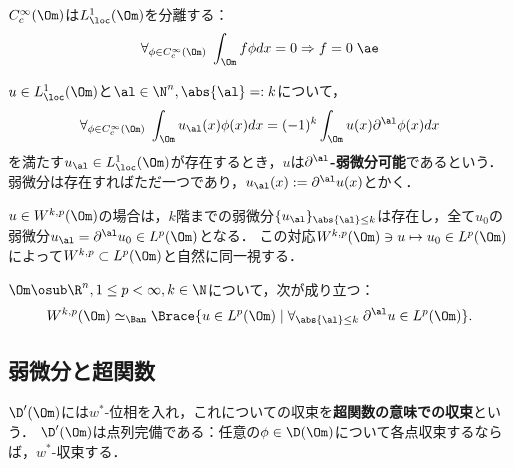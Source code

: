 \documentclass[uplatex, dvipdfmx]{jsreport}
\begin{document}
\begin{lemma}[変分法の基本補題]
    $C_c^\infty(\Om)$は$L^1_\loc(\Om)$を分離する：
    \[\forall_{\phi\in C_c^\infty(\Om)}\;\int_\Om f\phi dx=0\Rightarrow f=0\;\ae\]
\end{lemma}

\begin{definition}[弱微分]
    $u\in L^1_\loc(\Om)$と$\al\in\N^n,\abs{\al}=:k$について，
    \[\forall_{\phi\in C_c^\infty(\Om)}\;\int_\Om u_\al(x)\phi(x)dx=(-1)^k\int_\Om u(x)\partial^\al\phi(x)dx\]
    を満たす$u_\al\in L^1_\loc(\Om)$が存在するとき，$u$は\textbf{$\partial^\al$-弱微分可能}であるという．弱微分は存在すればただ一つであり，$u_\al(x):=\partial^\al u(x)$とかく．
\end{definition}

\begin{remarks}
    $u\in W^{k,p}(\Om)$の場合は，$k$階までの弱微分$\{u_\al\}_{\abs{\al}\le k}$は存在し，全て$u_0$の弱微分$u_\al=\partial^\al u_0\in L^p(\Om)$となる．
    この対応$W^{k,p}(\Om)\ni u\mapsto u_0\in L^p(\Om)$によって$W^{k,p}\subset L^p(\Om)$と自然に同一視する．
\end{remarks}

\begin{theorem}
    $\Om\osub\R^n,1\le p<\infty,k\in\N$について，次が成り立つ：
    \[W^{k,p}(\Om)\simeq_\Ban\Brace{u\in L^p(\Om)\mid\forall_{\abs{\al}\le k}\;\partial^\al u\in L^p(\Om)}.\]
\end{theorem}

\subsection{弱微分と超関数}

\begin{tcolorbox}[colframe=ForestGreen, colback=ForestGreen!10!white,breakable,colbacktitle=ForestGreen!40!white,coltitle=black,fonttitle=\bfseries\sffamily,
title=]
    $\D'(\Om)$には$w^*$-位相を入れ，これについての収束を\textbf{超関数の意味での収束}という．
    $\D'(\Om)$は点列完備である：任意の$\phi\in\D(\Om)$について各点収束するならば，$w^*$-収束する．
\end{tcolorbox}
\end{document}
